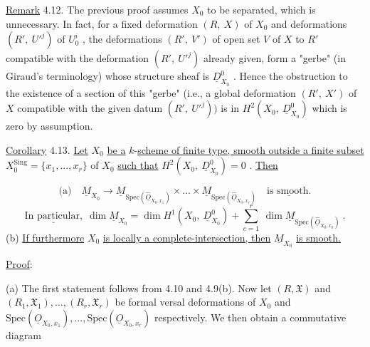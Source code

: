 \underline{Remark} 4.12.  The previous proof assumes  $X_0$  to be separated, which is unnecessary. In fact, for a fixed deformation  $(R,\ X)$  of  $X_0$  and deformations  $(R',\ U'^j)$  of $U_0^i$ , the deformations  $(R',\ V')$  of open set  $V$  of  $X$  to  $R'$  compatible with the deformation  $(R',\ U'^j)$  already given, form a  "gerbe"  (in Giraud's terminology) whose structure sheaf is  $\underline{D}^0_{X_0}$ . Hence the obstruction to the existence of a section of this  "gerbe"  (i.e., a global deformation  $(R',\ X')$  of  $X$  compatible with the given datum  $(R',\ U'^j))$  is in $H^2(X_0,\ \underline{D}^0_{X_0})$  which is zero by assumption.

\underline{Corollary} 4.13.  \underline{Let}  $X_0$  \underline{be a} $k$-\underline{scheme of finite type, smooth outside a finite subset}  $X_0^{\mathrm{Sing}} = \{x_1,\dots,x_r\}$  of  $X_0$  \underline{such that}  $H^2(X_0,\ \underline{D}^0_{X_0}) = 0$ . \underline{Then}

$$\text{(a)}\quad \underline{M}_{X_0} \to \underline{M}_{\mathrm{Spec}(\widehat{\underline{O}}_{X_0,x_1})} \times\dots\times \underline{M}_{\mathrm{Spec}(\widehat{\underline{O}}_{X_0,x_r})}\quad \underline{\text{is smooth.}}$$
$$\underline{\text{In particular,}}\ \ \dim \underline{M}_{X_0} = \dim H^1(X_0,\ \underline{D}^0_{X_0}) + \sum_{c=1}^{r} \ \dim \underline{M}_{\mathrm{Spec}(\widehat{\underline{O}}_{X_0,x_0})}\ .$$
(b)  \underline{If furthermore}  $X_0$  \underline{is locally a complete-intersection, then}  $\underline{M}_{X_0}$ \underline{is smooth.}


\underline{Proof}:

(a)  The first statement follows from 4.10 and 4.9(b). Now let  $(R, \mathfrak{X})$  and  $(R_1, \mathfrak{X}_1),...,(R_r, \mathfrak{X}_r)$  be formal versal deformations of  $X_0$  and  $\mathrm{Spec}(\underline{O}_{X_0,x_1}),...,\mathrm{Spec}(\underline{O}_{X_0,x_r})$  respectively. We then obtain a commutative diagram

